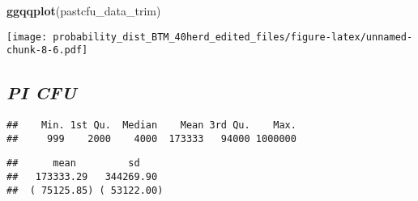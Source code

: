 \documentclass[]{article}
\newenvironment{Shaded}{\begin{snugshade}}{\end{snugshade}}
\newcommand{\KeywordTok}[1]{\textcolor[rgb]{0.13,0.29,0.53}{\textbf{#1}}}
\newcommand{\FloatTok}[1]{\textcolor[rgb]{0.00,0.00,0.81}{#1}}
\newcommand{\StringTok}[1]{\textcolor[rgb]{0.31,0.60,0.02}{#1}}
\newcommand{\CommentTok}[1]{\textcolor[rgb]{0.56,0.35,0.01}{\textit{#1}}}
\newcommand{\OperatorTok}[1]{\textcolor[rgb]{0.81,0.36,0.00}{\textbf{#1}}}
\newcommand{\NormalTok}[1]{#1}
\begin{document}
\begin{Shaded}
\begin{Highlighting}[]
\KeywordTok{ggqqplot}\NormalTok{(pastcfu_data_trim)}
\end{Highlighting}
\end{Shaded}

\texttt{[image: probability\_dist\_BTM\_40herd\_edited\_files/figure-latex/unnamed-chunk-8-6.pdf]}

\subsection{\texorpdfstring{\textbf{\emph{PI
CFU}}}{PI CFU}}\label{pi-cfu}

\begin{Shaded}
\end{Shaded}

\begin{verbatim}
##    Min. 1st Qu.  Median    Mean 3rd Qu.    Max. 
##     999    2000    4000  173333   94000 1000000
\end{verbatim}

\begin{Shaded}
\end{Shaded}

\begin{verbatim}
##      mean         sd    
##   173333.29   344269.90 
##  ( 75125.85) ( 53122.00)
\end{verbatim}
\end{document}
